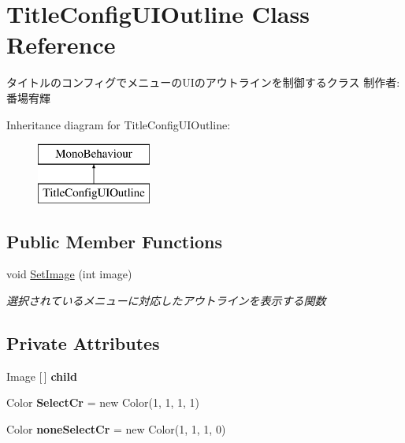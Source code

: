 \hypertarget{class_title_config_u_i_outline}{}\section{Title\+Config\+U\+I\+Outline Class Reference}
\label{class_title_config_u_i_outline}


タイトルのコンフィグでメニューの\+U\+Iのアウトラインを制御するクラス 制作者\+:番場宥輝  


Inheritance diagram for Title\+Config\+U\+I\+Outline\+:\begin{figure}[H]
\begin{center}
\leavevmode
\includegraphics[height=2.000000cm]{class_title_config_u_i_outline}
\end{center}
\end{figure}
\subsection*{Public Member Functions}
\begin{DoxyCompactItemize}
\item 
void \hyperlink{class_title_config_u_i_outline_a9cc515749de04dacb3b5d287108dab5a}{Set\+Image} (int image)
\begin{DoxyCompactList}\small\item\em 選択されているメニューに対応したアウトラインを表示する関数 \end{DoxyCompactList}\end{DoxyCompactItemize}
\subsection*{Private Attributes}
\begin{DoxyCompactItemize}
\item 
\mbox{\label{class_title_config_u_i_outline_a70e37029b3956be4c00e2b155a86480a}} 
Image \mbox{[}$\,$\mbox{]} {\bfseries child}
\item 
\mbox{\label{class_title_config_u_i_outline_a59feefa742911bbfc71e35a80f4b9cd6}} 
Color {\bfseries Select\+Cr} = new Color(1, 1, 1, 1)
\item 
\mbox{\label{class_title_config_u_i_outline_acb1392e1c20850935e61cac47a519a04}} 
Color {\bfseries none\+Select\+Cr} = new Color(1, 1, 1, 0)
\end{DoxyCompactItemize}


